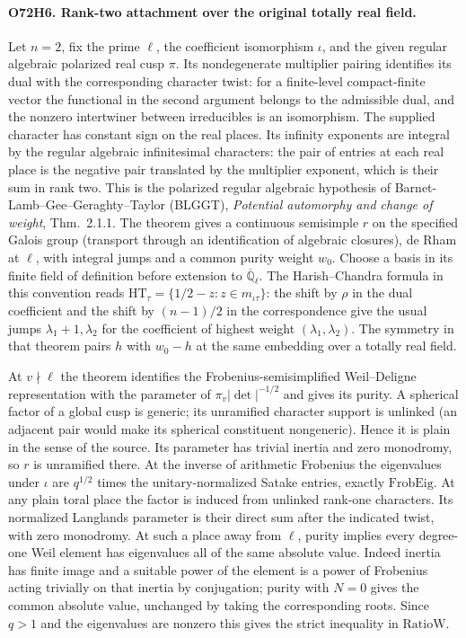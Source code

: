 \paragraph{O72H6. Rank-two attachment over the original totally real field.}
Let $n=2$, fix the prime $\ell$, the coefficient isomorphism $\iota$,
and the given regular algebraic polarized real cusp $\pi$. Its
nondegenerate multiplier pairing identifies its dual with the
corresponding character twist: for a finite-level compact-finite
vector the functional in the second argument belongs to the
admissible dual, and the nonzero intertwiner between irreducibles
is an isomorphism. The supplied character has constant sign on
the real places. Its infinity exponents are integral by the
regular algebraic infinitesimal characters: the pair of entries at
each real place is the negative pair translated by the multiplier
exponent, which is their sum in rank two. This is the polarized
regular algebraic hypothesis of Barnet-Lamb--Gee--Geraghty--Taylor
(BLGGT), \emph{Potential automorphy and change of weight},
Thm.~2.1.1. The theorem gives a continuous semisimple $r$ on the
specified Galois group (transport through an identification of
algebraic closures), de Rham at $\ell$, with integral jumps and
a common purity weight $w_0$. Choose a basis in its finite field
of definition before extension to $\overline{\mathbb Q}_\ell$.
The Harish--Chandra formula in this convention reads
$\mathrm{HT}_\tau=\{1/2-z:z\in m_{\iota\tau}\}$: the shift
by $\rho$ in the dual coefficient and the shift by $(n-1)/2$
in the correspondence give the usual jumps
$\lambda_1+1,\lambda_2$ for the coefficient of highest weight
$(\lambda_1,\lambda_2)$. The symmetry in that theorem pairs
$h$ with $w_0-h$ at the same embedding over a totally real field.

At $v\nmid\ell$ the theorem identifies the Frobenius-semisimplified
Weil--Deligne representation with the parameter of
$\pi_v|\det|^{-1/2}$ and gives its purity. A spherical factor of
a global cusp is generic; its unramified character support is
unlinked (an adjacent pair would make its spherical constituent
nongeneric). Hence it is plain in the sense of the source. Its
parameter has trivial inertia and zero monodromy, so $r$ is
unramified there. At the inverse of arithmetic Frobenius the
eigenvalues under $\iota$ are $q^{1/2}$ times the unitary-normalized
Satake entries, exactly $\mathrm{FrobEig}$. At any plain toral
place the factor is induced from unlinked rank-one characters.
Its normalized Langlands parameter is their direct sum after the
indicated twist, with zero monodromy. At such a place away from
$\ell$, purity implies every degree-one Weil element has
eigenvalues all of the same absolute value. Indeed inertia has
finite image and a suitable power of the element is a power of
Frobenius acting trivially on that inertia by conjugation; purity
with $N=0$ gives the common absolute value, unchanged by taking
the corresponding roots. Since $q>1$ and the eigenvalues are
nonzero this gives the strict inequality in $\mathrm{RatioW}$.

